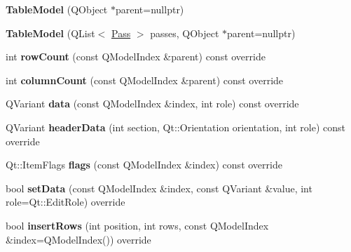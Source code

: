 \begin{DoxyCompactItemize}
\item 
\mbox{\label{class_table_model_a76647c50ae162a4f91daf4a9f76f6fb6}} 
{\bfseries Table\+Model} (Q\+Object $\ast$parent=nullptr)
\item 
\mbox{\label{class_table_model_a7e4c501d8f8b7b5473fda21fcd21df18}} 
{\bfseries Table\+Model} (Q\+List$<$ \mbox{\hyperlink{struct_pass}{Pass}} $>$ passes, Q\+Object $\ast$parent=nullptr)
\item 
\mbox{\label{class_table_model_a93b1a8bd720d4633ff3e16b4b0779c70}} 
int {\bfseries row\+Count} (const Q\+Model\+Index \&parent) const override
\item 
\mbox{\label{class_table_model_a159d3e9c8b93b60d61c2d600e5645ede}} 
int {\bfseries column\+Count} (const Q\+Model\+Index \&parent) const override
\item 
\mbox{\label{class_table_model_ae7ff98675b7d5f7405e5e2ed7fe81fc9}} 
Q\+Variant {\bfseries data} (const Q\+Model\+Index \&index, int role) const override
\item 
\mbox{\label{class_table_model_acc300ae9cc6468e1be70794319146b12}} 
Q\+Variant {\bfseries header\+Data} (int section, Qt\+::\+Orientation orientation, int role) const override
\item 
\mbox{\label{class_table_model_a4273c8d963730baa0a155ae387628e88}} 
Qt\+::\+Item\+Flags {\bfseries flags} (const Q\+Model\+Index \&index) const override
\item 
\mbox{\label{class_table_model_a31f2ce205d0b33242e3ac3356bd75c81}} 
bool {\bfseries set\+Data} (const Q\+Model\+Index \&index, const Q\+Variant \&value, int role=Qt\+::\+Edit\+Role) override
\item 
\mbox{\label{class_table_model_ab105c44d2a2937b12ea5a0f2914da210}} 
bool {\bfseries insert\+Rows} (int position, int rows, const Q\+Model\+Index \&index=Q\+Model\+Index()) override
\item 
\mbox{\label{class_table_model_a31b8936b340d2873eb20730d2925c6a0}} 

\end{DoxyCompactItemize}
